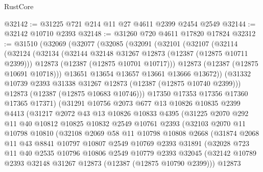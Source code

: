 \begin{lexlean}{RustCore}
\begin{coremodule}
@32142 := @31225 @721 @214 @11 @27 @4611 @2399 @2454 @2549
@32144 := @32142 @10710 @2393
@32148 := @31260 @720 @4611 @17820 @17824
@32312 := @31510
    (@32069
      (@32077
        (@32085
          (@32091
            (@32101
              (@32107
                (@32114
                  (@32124
                    (@32134
                      (@32144 @32148 @31267 @12873 (@12387 (@12875 @10711 @2399)))
                      @12873
                      (@12387 (@12875 @10701 @10717)))
                    @12873
                    (@12387 (@12875 @10691 @10718)))
                  @13651
                  @13654
                  @13657
                  @13661
                  @13666
                  @13672))
              (@31332 @10739 @2393 @31338 @31267 @12873 (@12387 (@12875 @10740 @2399)))
              @12873
              (@12387 (@12875 @10683 @10746)))
            @17350
            @17353
            @17356
            @17360
            @17365
            @17371)
          (@31291
            @10756
            @2073
            @677
            @13
            @10826
            @10835
            @2399
            @4413
            (@31217
              @2072
              @43
              @13
              @10826
              @10833
              @4395
              (@31225
                @2070
                @292
                @11
                @40
                @10812
                @10825
                @10832
                @2549
                @10761
                @2393
                (@32103
                  @2070
                  @11
                  @10798
                  @10810
                  (@32108
                    @2069
                    @58
                    @11
                    @10798
                    @10808
                    @2668
                    (@31874
                      @2068
                      @11
                      @43
                      @8841
                      @10797
                      @10807
                      @2549
                      @10769
                      @2393
                      @31891
                      (@32028
                        @723
                        @11
                        @40
                        @2535
                        @10796
                        @10806
                        @2549
                        @10779
                        @2393
                        @32045
                        (@32142 @10789 @2393 @32148 @31267 @12873 (@12387 (@12875 @10790 @2399)))
                        @12873

\end{coremodule}
\end{lexlean}
